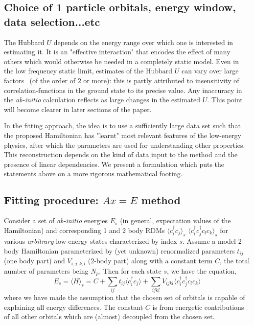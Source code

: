 \documentclass[prl,12pt,onecolumn,nofootinbib,notitlepage,english,superscriptaddress]{revtex4-1}
\newcommand{\HJC}[1]{{\color{RED}{\bf HJC: #1}}}
\begin{document}
\subsection{Choice of 1 particle orbitals, energy window, data selection...etc}
\HJC{IAO, Wannier or something else?}

\HJC{Choice of energy window - Hubbard parameters could be energy dependent. Static vs dynamic (energy dependent) 
models.}
The Hubbard $U$ depends on the energy range 
over which one is interested in estimating it. It is an 
"effective interaction" that encodes the effect of many others 
which would otherwise be needed in a completely static model.
Even in the low frequency static limit, estimates 
of the Hubbard $U$ can vary over large factors~\cite{Fei_Lin} 
(of the order of $2$ or more): this is partly attributed to insensitivity 
of correlation-functions in the ground state to its precise value. 
Any inaccuracy in the \emph{ab-initio} calculation reflects as 
large changes in the estimated $U$. This point 
will become clearer in later sections of the paper.
 
\HJC {What kind of data is needed and how much is enough}
In the fitting approach, the idea is to use a sufficiently 
large data set such that the proposed Hamiltonian has "learnt" most 
relevant features of the low-energy physics, after which the parameters 
are used for understanding other properties. 
This reconstruction depends on the kind of data input to the method 
and the presence of linear dependencies. 
We present a formulation which puts the statements above 
on a more rigorous mathematical footing.

\HJC {Given data, how do we achieve what we want...}
\subsection{Fitting procedure: $Ax=E$ method}
\label{sec:AxE}
Consider a set of \emph{ab-initio} 
energies $E_s$ (in general, expectation values of the Hamiltonian) 
and corresponding 1 and 2 body RDMs $\langle c_i^{\dagger} c_j \rangle_s$ 
$\langle c_i^{\dagger}c_j^{\dagger} c_l c_k \rangle_s$ 
for various \emph{arbitrary} low-energy states characterized by index $s$. 
Assume a model 2-body Hamiltonian parameterized by (yet unknown) 
renormalized parameters $t_{ij}$ (one body part) 
and $V_{i,j,k,l}$ (2-body part) along with a constant term $C$, 
the total number of parameters being $N_p$. Then for each state $s$, 
we have the equation, 
\begin{equation}
	E_s = \langle H \rangle_s = C + \sum_{ij} t_{ij} \langle c_i^{\dagger} c_j \rangle + \sum_{ijkl} V_{ijkl} \langle c_i^{\dagger}c_j^{\dagger} c_l c_k \rangle  
\end{equation}
where we have made the assumption that the chosen set of orbitals 
is capable of explaining all energy differences. The constant $C$ is from energetic contributions 
of all other orbitals which are (almost) decoupled from the chosen set.  
 
\end{document}
